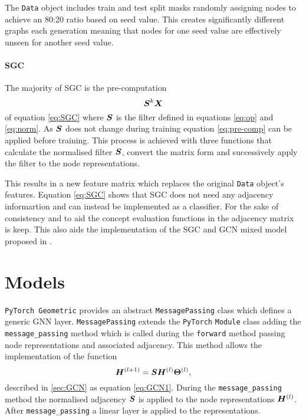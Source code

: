 The \texttt{Data} object includes train and test split masks randomly assigning nodes to achieve an 80:20 ratio based on seed value.
This 
creates significantly different graphs each generation
meaning that nodes for one seed value are effectively unseen for another seed value.

\paragraph{SGC}
The majority of SGC is the pre-computation
\begin{equation}
    \label{eq:pre-comp}
    {\bm{S}}^k{\bm{X}}
\end{equation}
of equation \ref{eq:SGC} where ${\bm{S}}$ is the filter defined in equations \ref{eq:op} and \ref{eq:norm}.
As ${\bm{S}}$ 
does not change during training equation \ref{eq:pre-comp} can be applied before training.
This process is achieved with three functions that calculate the normalised filter ${\bm{S}}$,
convert the matrix form and successively apply the filter to the node representations.

This results in a new feature matrix which replaces the original \texttt{Data} object's features.
Equation \ref{eq:SGC} shows that SGC does not need any adjacency informartion and can instead be implemented as a classifier.
For the sake of consistency and to aid the concept evaluation functions in  the adjacency matrix is keep.
This also aids the implementation of the SGC and GCN mixed model proposed in .

\section{Models}
\label{sec:models}

\texttt{PyTorch Geometric}\cite{Fey/Lenssen/2019} provides an abstract \texttt{MessagePassing} class which defines a generic GNN layer.
\texttt{MessagePassing} extends the \texttt{PyTorch} \texttt{Module} class adding the \texttt{message\_passing} method which is called during the \texttt{forward} method passing node representations and associated adjacency.
This method allows the implementation of the function
\begin{equation}
    {\bm{H}}^{(l+1)} = {\bm{S}}{\bm{H}}^{(l)}\bm{\Theta}^{(l)},
\end{equation}
described in \ref{sec:GCN} as equation \ref{eq:GCN1}.
During the \texttt{message\_passing} method the normalised adjacency ${\bm{S}}$ is applied to the node representations ${\bm{H}}^{(l)}$.
After \texttt{message\_passing} a linear layer is applied to the representations.

